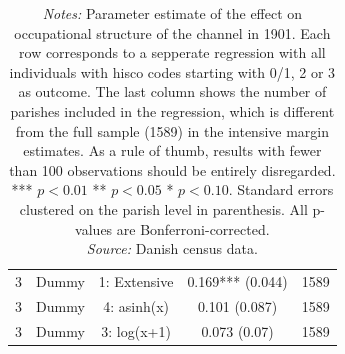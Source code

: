 \begin{table}[]
\begin{tabular}{ccccc}
3 & Dummy & 1: Extensive & 0.169*** (0.044) & 1589\\
3 & Dummy & 4: asinh(x) & 0.101 (0.087) & 1589\\
3 & Dummy & 3: log(x+1) & 0.073 (0.07) & 1589\\
\bottomrule
\end{tabular}
\parbox{0.9\textwidth}{
\caption*{\footnotesize \textit{Notes:} Parameter estimate of the effect on occupational structure of the channel in 1901. Each row corresponds to a sepperate regression with all individuals with hisco codes starting with 0/1, 2 or 3 as outcome. The last column shows the number of parishes included in the regression, which is different from the full sample (1589) in the intensive margin estimates. As a rule of thumb, results with fewer than 100 observations should be entirely disregarded. *** $p< 0.01$ ** $p< 0.05$ * $p< 0.10$. Standard errors clustered on the parish level in parenthesis. All p-values are Bonferroni-corrected. \\ \textit{Source:} Danish census data.}
}
\end{table}

